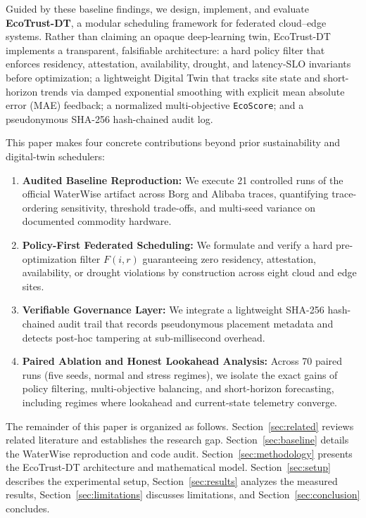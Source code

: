 \documentclass[conference]{IEEEtran}
\begin{document}
Guided by these baseline findings, we design, implement, and evaluate \textbf{EcoTrust-DT}, a modular scheduling framework for federated cloud--edge systems. Rather than claiming an opaque deep-learning twin, EcoTrust-DT implements a transparent, falsifiable architecture: a hard policy filter that enforces residency, attestation, availability, drought, and latency-SLO invariants before optimization; a lightweight Digital Twin that tracks site state and short-horizon trends via damped exponential smoothing with explicit mean absolute error (MAE) feedback; a normalized multi-objective \texttt{EcoScore}; and a pseudonymous SHA-256 hash-chained audit log.

This paper makes four concrete contributions beyond prior sustainability and digital-twin schedulers:
\begin{enumerate}[leftmargin=*]
    \item \textbf{Audited Baseline Reproduction:} We execute 21 controlled runs of the official WaterWise artifact across Borg and Alibaba traces, quantifying trace-ordering sensitivity, threshold trade-offs, and multi-seed variance on documented commodity hardware.
    \item \textbf{Policy-First Federated Scheduling:} We formulate and verify a hard pre-optimization filter $F(i,r)$ guaranteeing zero residency, attestation, availability, or drought violations by construction across eight cloud and edge sites.
    \item \textbf{Verifiable Governance Layer:} We integrate a lightweight SHA-256 hash-chained audit trail that records pseudonymous placement metadata and detects post-hoc tampering at sub-millisecond overhead.
    \item \textbf{Paired Ablation and Honest Lookahead Analysis:} Across 70 paired runs (five seeds, normal and stress regimes), we isolate the exact gains of policy filtering, multi-objective balancing, and short-horizon forecasting, including regimes where lookahead and current-state telemetry converge.
\end{enumerate}

The remainder of this paper is organized as follows. Section~\ref{sec:related} reviews related literature and establishes the research gap. Section~\ref{sec:baseline} details the WaterWise reproduction and code audit. Section~\ref{sec:methodology} presents the EcoTrust-DT architecture and mathematical model. Section~\ref{sec:setup} describes the experimental setup, Section~\ref{sec:results} analyzes the measured results, Section~\ref{sec:limitations} discusses limitations, and Section~\ref{sec:conclusion} concludes.
\end{document}
